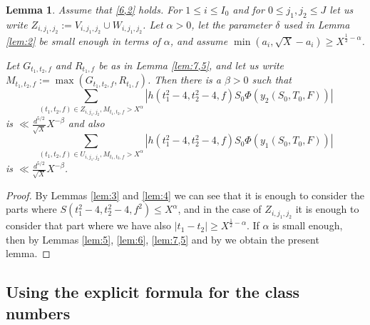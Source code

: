\documentclass[12pt]{amsart}
\newtheorem{lemma}[theorem]{Lemma}
\theoremstyle{definition}
\numberwithin{equation}{section}
\begin{document}
\begin{lemma}\label{lem:8}Assume that \eqref{6,2} holds. For $1\le
i\le I_0$ and for
$0\le j_1,j_2\le J$ let us write $Z_{i,j_1,j_2}:=V_{i,j_1,j_2}\cup
W_{i,j_1,j_2}$. Let
$\alpha >0$, let the parameter $\delta$ used in Lemma \ref{lem:2} be
small enough in terms of $\alpha$, and assume
$\min\left(a_i,\sqrt {X}-a_i\right)\ge X^{\frac 12-\alpha}$.

Let $G_{t_1,t_2,f}$ and $R_{t_1,f}$ be as in Lemma \ref{lem:7,5}, and
let us write $M_{t_1,t_2,f}:=\max\left(G_{t_1,t_2,f},R_{t_1,f}\right
)$. Then there is a $\beta >0$ such that
\begin{equation}\sum_{\left(t_1,t_2,f\right)\in Z_{i,j_1,j_2},M_{
t_1,t_2,f}>X^{\alpha}}\left|h\left(t_1^2-4,t_2^2-4,f\right)S_0\Phi\left
(y_2\left(S_0,T_0,F\right)\right)\right|\label{103}\end{equation}
is $\ll\frac {d^{5/2}}{\sqrt {X}}X^{-\beta}$ and also
\begin{equation}\sum_{\left(t_1,t_2,f\right)\in U_{i,j_1,j_2},M_{
t_1,t_2,f}>X^{\alpha}}\left|h\left(t_1^2-4,t_2^2-4,f\right)S_0\Phi\left
(y_1\left(S_0,T_0,F\right)\right)\right|\label{104}\end{equation}
is $\ll\frac {d^{5/2}}{\sqrt {X}}X^{-\beta}$.
\end{lemma}

\begin{proof}By Lemmas \ref{lem:3} and \ref{lem:4} we
can see that it is enough to consider the parts where
$S\left(t_1^2-4,t_2^2-4,f^2\right)\le X^{\alpha}$, and in the case of $
Z_{i,j_1,j_2}$ it is
enough to consider that part where we have also
$\left|t_1-t_2\right|\ge X^{\frac 12-\alpha}$. If $\alpha$ is small enough, then by Lemmas
\ref{lem:5}, \ref{lem:6}, \ref{lem:7,5} and by \cite[Lemma 3.1]{Biro} we obtain the
present lemma.
\end{proof}





\subsection{Using the explicit formula for the class
numbers}
\end{document}
